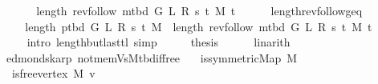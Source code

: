 \begin{isabellebody}
\endisataginvisible
{\isafoldinvisible}%
%
\isadeliminvisible
\isanewline
%
\endisadeliminvisible
%
\isadelimproof
%
\endisadelimproof
%
\isatagproof
{}\isamarkupfalse%
\ {\isacharminus}{\kern0pt}\isanewline
\ \ \isamarkupfalse%
\ {\isachardoublequoteopen}{}\ {\isasymle}\ length\ {\isacharparenleft}{\kern0pt}rev{\isacharunderscore}{\kern0pt}follow\ {\isacharparenleft}{\kern0pt}m{\isacharunderscore}{\kern0pt}tbd\ G\ L\ R\ s\ t\ M{\isacharparenright}{\kern0pt}\ t{\isacharparenright}{\kern0pt}{\isachardoublequoteclose}\isanewline
\ \ \ \ \isamarkupfalse%
\ length{\isacharunderscore}{\kern0pt}rev{\isacharunderscore}{\kern0pt}follow{\isacharunderscore}{\kern0pt}geq{\isacharunderscore}{\kern0pt}{}\isanewline
\ \ \ \ \isacommand{{\isachardot}{\kern0pt}}\isamarkupfalse%
\isanewline
\ \ \isamarkupfalse%
\ \isamarkupfalse%
\ {\isachardoublequoteopen}length\ {\isacharparenleft}{\kern0pt}p{\isacharunderscore}{\kern0pt}tbd\ G\ L\ R\ s\ t\ M{\isacharparenright}{\kern0pt}\ {\isacharequal}{\kern0pt}\ length\ {\isacharparenleft}{\kern0pt}rev{\isacharunderscore}{\kern0pt}follow\ {\isacharparenleft}{\kern0pt}m{\isacharunderscore}{\kern0pt}tbd\ G\ L\ R\ s\ t\ M{\isacharparenright}{\kern0pt}\ t{\isacharparenright}{\kern0pt}\ {\isacharminus}{\kern0pt}\ {}{\isachardoublequoteclose}\isanewline
\ \ \ \ \isamarkupfalse%
\ {\isacharparenleft}{\kern0pt}intro\ length{\isacharunderscore}{\kern0pt}butlast{\isacharunderscore}{\kern0pt}tl{\isacharparenright}{\kern0pt}\ simp\isanewline
\ \ \isamarkupfalse%
\ \isamarkupfalse%
\ {\isacharquery}{\kern0pt}thesis\isanewline
\ \ \ \ \isamarkupfalse%
\ linarith\isanewline
{}\isamarkupfalse%
%
\endisatagproof
{\isafoldproof}%
%
\isadelimproof
\isanewline
%
\endisadelimproof
%
\isadeliminvisible
\isanewline
%
\endisadeliminvisible
%
\isataginvisible
{}\isamarkupfalse%
\ {\isacharparenleft}{\kern0pt}\ edmonds{\isacharunderscore}{\kern0pt}karp{\isacharparenright}{\kern0pt}\ not{\isacharunderscore}{\kern0pt}mem{\isacharunderscore}{\kern0pt}Vs{\isacharunderscore}{\kern0pt}M{\isacharunderscore}{\kern0pt}tbd{\isacharunderscore}{\kern0pt}if{\isacharunderscore}{\kern0pt}free{\isacharcolon}{\kern0pt}\isanewline
\ \ \ {\isachardoublequoteopen}is{\isacharunderscore}{\kern0pt}symmetric{\isacharunderscore}{\kern0pt}Map\ M{\isachardoublequoteclose}\isanewline
\ \ \ {\isachardoublequoteopen}is{\isacharunderscore}{\kern0pt}free{\isacharunderscore}{\kern0pt}vertex\ M\ v{\isachardoublequoteclose}\isanewline

\end{isabellebody}
